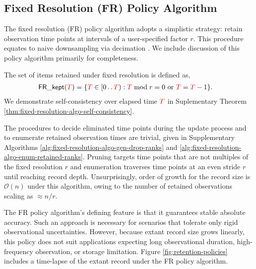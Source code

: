 \subsection{Fixed Resolution (FR) Policy Algorithm}
\label{sec:fixed-resolution-algo}

The fixed resolution (FR) policy algorithm adopts a simplistic strategy: retain observation time points at intervals of a user-specified factor $r$.
This procedure equates to naive downsampling via decimation \citep[p. 31]{crochiere1983multirate}.
We include discussion of this policy algorithm primarily for completeness.

The set of items retained under fixed resolution is defined as,
\begin{align}
\mathsf{FR\_kept}(\colorT)
&= \{
\colorTbar \in [0\twodots\colorT)
: \colorTbar \bmod r = 0 \text{ or } \colorTbar = \colorT - 1
\}.
\label{eqn:fr_kept}
\end{align}
We demonstrate self-consistency over elapsed time $\colorT$ in Suplementary Theorem \ref{thm:fixed-resolution-algo-self-consistency}.

The procedures to decide eliminated time points during the update process and to enumerate retained observation times are trivial, given in Supplementary Algorithms \ref{alg:fixed-resolution-algo-gen-drop-ranks} and \ref{alg:fixed-resolution-algo-enum-retained-ranks}.
Pruning targets time points that are not multiples of the fixed resolution $r$ and enumeration traverses time points at an even stride $r$ until reaching record depth.
Unsurprisingly, order of growth for the record size is $\mathcal{O}(n)$ under this algorithm, owing to the number of retained observations scaling as $\approx n / r$.




% 
% 

The FR policy algorithm's defining feature is that it guarantees stable absolute accuracy.
Such an approach is necessary for scenarios that tolerate only rigid observational uncertainties.
However, because extant record size grows linearly, this policy does not suit applications expecting long observational duration, high-frequency observation, or storage limitation.
Figure \ref{fig:retention-policies} includes a time-lapse of the extant record under the FR policy algorithm.

% 
% 

